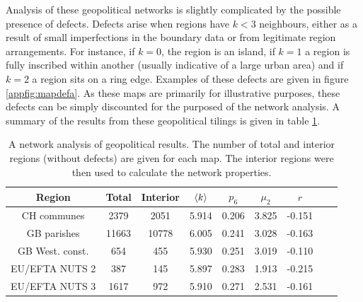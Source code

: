 Analysis of these geopolitical networks is slightly complicated by the possible presence of defects.
Defects arise when regions have $k<3$ neighbours, either as a result of small imperfections in the boundary data or from legitimate region arrangements.
For instance, if $k=0$, the region is an island, if $k=1$ a region is fully inscribed within another (usually indicative of a large urban area) and if $k=2$ a region sits on a ring edge.
Examples of these defects are given in figure \ref{appfig:mapdefa}.
As these maps are primarily for illustrative purposes, these defects can be simply discounted for the purposed of the network analysis.
A summary of the results from these geopolitical tilings is given in table \ref{tab:mapnet}.

\begin{table}[bt]
\caption{A network analysis of geopolitical results. The number of total and interior regions (without defects) are given for each map. The interior regions were then used to calculate the network properties.}
\label{tab:mapnet}
\centering
\begin{tabular}{ccccccccc}
\toprule
        Region & Total & Interior & $\langle k \rangle$ & $p_6$ & $\mu_2$ & $r$ \\
        \midrule
        CH communes & 2379  & 2051 & 5.914    &    0.206     &   3.825   &    -0.151     \\
        GB parishes & 11663  & 10778  & 6.005    &    0.241    &    3.028   &    -0.163   \\
        GB West. const. & 654  & 455  &  5.930 &  0.251 & 3.019  & -0.110 \\
        EU/EFTA NUTS 2 & 387  & 145 & 5.897   &     0.283    &    1.913   &    -0.215   \\
        EU/EFTA NUTS 3 & 1617  & 972  & 5.910     &   0.271    &    2.531   &    -0.161   \\
        \bottomrule
\end{tabular}
\end{table}

